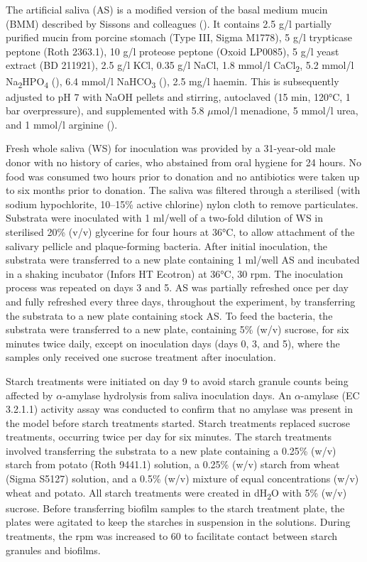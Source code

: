 \documentclass[
  b5paper,
]{book}
\begin{document}
The artificial saliva (AS) is a modified version of the basal medium
mucin (BMM) described by Sissons and colleagues
(). It contains 2.5
g/l partially purified mucin from porcine stomach (Type III, Sigma
M1778), 5 g/l trypticase peptone (Roth 2363.1), 10 g/l proteose peptone
(Oxoid LP0085), 5 g/l yeast extract (BD 211921), 2.5 g/l KCl, 0.35 g/l
NaCl, 1.8 mmol/l CaCl\textsubscript{2}, 5.2 mmol/l
Na\textsubscript{2}HPO\textsubscript{4}
(),
6.4 mmol/l NaHCO\textsubscript{3}
(), 2.5 mg/l
haemin. This is subsequently adjusted to pH 7 with NaOH pellets and
stirring, autoclaved (15 min, 120°C, 1 bar overpressure), and
supplemented with 5.8 \(\mu\)mol/l menadione, 5 mmol/l urea, and 1
mmol/l arginine ().

Fresh whole saliva (WS) for inoculation was provided by a 31-year-old
male donor with no history of caries, who abstained from oral hygiene
for 24 hours. No food was consumed two hours prior to donation and no
antibiotics were taken up to six months prior to donation. The saliva
was filtered through a sterilised (with sodium hypochlorite, 10--15\%
active chlorine) nylon cloth to remove particulates. Substrata were
inoculated with 1 ml/well of a two-fold dilution of WS in sterilised
20\% (v/v) glycerine for four hours at 36°C, to allow attachment of the
salivary pellicle and plaque-forming bacteria. After initial
inoculation, the substrata were transferred to a new plate containing 1
ml/well AS and incubated in a shaking incubator (Infors HT Ecotron) at
36°C, 30 rpm. The inoculation process was repeated on days 3 and 5. AS
was partially refreshed once per day and fully refreshed every three
days, throughout the experiment, by transferring the substrata to a new
plate containing stock AS. To feed the bacteria, the substrata were
transferred to a new plate, containing 5\% (w/v) sucrose, for six
minutes twice daily, except on inoculation days (days 0, 3, and 5),
where the samples only received one sucrose treatment after inoculation.

Starch treatments were initiated on day 9 to avoid starch granule counts
being affected by \(\alpha\)-amylase hydrolysis from saliva inoculation
days. An \(\alpha\)-amylase (EC 3.2.1.1) activity assay was conducted to
confirm that no amylase was present in the model before starch
treatments started. Starch treatments replaced sucrose treatments,
occurring twice per day for six minutes. The starch treatments involved
transferring the substrata to a new plate containing a 0.25\% (w/v)
starch from potato (Roth 9441.1) solution, a 0.25\% (w/v) starch from
wheat (Sigma S5127) solution, and a 0.5\% (w/v) mixture of equal
concentrations (w/v) wheat and potato. All starch treatments were
created in dH\textsubscript{2}O with 5\% (w/v) sucrose. Before
transferring biofilm samples to the starch treatment plate, the plates
were agitated to keep the starches in suspension in the solutions.
During treatments, the rpm was increased to 60 to facilitate contact
between starch granules and biofilms.
\end{document}
